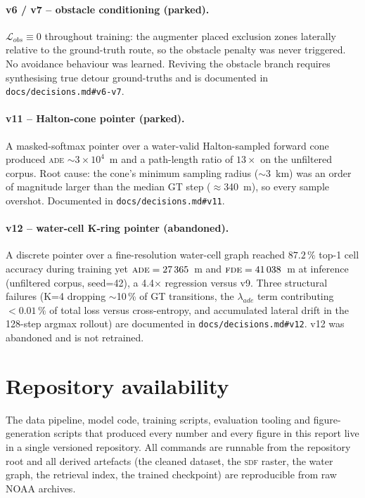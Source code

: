 \documentclass[oneside, a4paper, onecolumn, 11pt]{article}
\newcommand{\ade}{\textsc{ade}}
\newcommand{\fde}{\textsc{fde}}
\newcommand{\sdf}{\textsc{sdf}}
\begin{document}
\paragraph{v6 / v7 -- obstacle conditioning (parked).}
$\mathcal{L}_{obs} \equiv 0$ throughout training: the augmenter
placed exclusion zones laterally relative to the ground-truth route,
so the obstacle penalty was never triggered.  No avoidance behaviour
was learned.  Reviving the obstacle branch requires synthesising
true detour ground-truths and is documented in
\texttt{docs/decisions.md\#v6-v7}.

\paragraph{v11 -- Halton-cone pointer (parked).}
A masked-softmax pointer over a water-valid Halton-sampled forward
cone produced \ade{} $\sim 3 \times 10^4$~m and a path-length ratio
of $13\times$ on the unfiltered corpus.  Root cause: the cone's
minimum sampling radius ($\sim$3~km) was an order of magnitude
larger than the median GT step ($\approx$340~m), so every sample
overshot.  Documented in \texttt{docs/decisions.md\#v11}.

\paragraph{v12 -- water-cell K-ring pointer (abandoned).}
A discrete pointer over a fine-resolution water-cell graph reached
$87.2\,\%$ top-1 cell accuracy during training yet $\ade =
27\,365$~m and $\fde = 41\,038$~m at inference (unfiltered corpus,
seed=42), a 4.4$\times$ regression versus v9.  Three structural
failures (K=4 dropping $\sim$10\,\% of GT transitions, the
$\lambda_{ade}$ term contributing $<0.01\,\%$ of total loss versus
cross-entropy, and accumulated lateral drift in the 128-step argmax
rollout) are documented in \texttt{docs/decisions.md\#v12}.  v12 was
abandoned and is not retrained.

\section{Repository availability}\label{app:repo}

The data pipeline, model code, training scripts, evaluation tooling and
figure-generation scripts that produced every number and every figure
in this report live in a single versioned repository.  All commands are
runnable from the repository root and all derived artefacts (the
cleaned dataset, the \sdf{} raster, the water graph, the retrieval
index, the trained checkpoint) are reproducible from raw NOAA archives.
\end{document}
